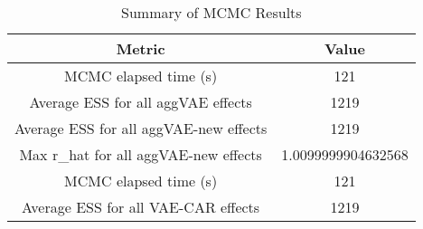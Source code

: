 
\begin{table}[h!]
\centering
\begin{tabular}{|c|c|}
\hline
\textbf{Metric} & \textbf{Value} \\
\hline
MCMC elapsed time (s) & 121 \\
\hline
Average ESS for all aggVAE effects & 1219 \\
\hline
Average ESS for all aggVAE-new effects & 1219 \\
\hline
Max r\_hat for all aggVAE-new effects & 1.0099999904632568 \\
\hline
MCMC elapsed time (s) & 121 \\
\hline
Average ESS for all VAE-CAR effects & 1219 \\
\hline
\end{tabular}
\caption{Summary of MCMC Results}
\label{table:mcmc_summary}
\end{table}
